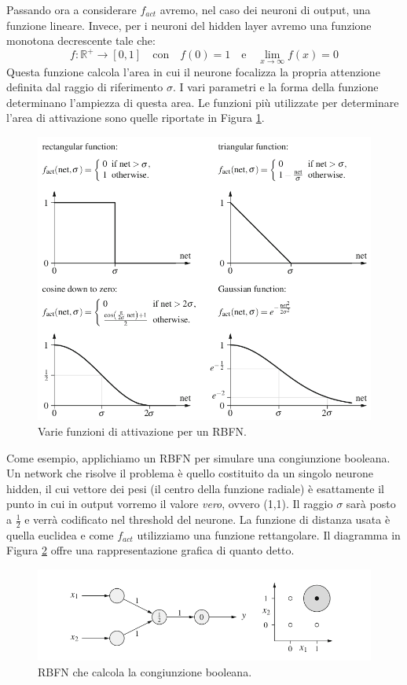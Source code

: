 \documentclass[10pt,a4paper]{article}
\begin{document}
Passando ora a considerare $f_{act}$ avremo, nel caso dei neuroni di output, una funzione lineare. Invece, per i neuroni del hidden layer avremo una funzione monotona decrescente tale che:
$$
f: \mathbb{R}^{+} \to [0,1] \quad \text{con} \quad f(0) = 1 \quad \text{e} \quad \lim_{x \to \infty} f(x) = 0
$$
Questa funzione calcola l'area in cui il neurone focalizza la propria attenzione definita dal raggio di riferimento $\sigma$. I vari parametri e la forma della funzione determinano l'ampiezza di questa area. Le funzioni più utilizzate per determinare l'area di attivazione sono quelle riportate in Figura \ref{fig:17}.
\begin{figure}
\centering
\includegraphics[scale=0.3]{img/act_rbf.png}
\caption{Varie funzioni di attivazione per un RBFN.}
\label{fig:17}
\end{figure}
Come esempio, applichiamo un RBFN per simulare una congiunzione booleana. Un network che risolve il problema è quello costituito da un singolo neurone hidden, il cui vettore dei pesi (il centro della funzione radiale) è esattamente il punto in cui in output vorremo il valore \emph{vero}, ovvero (1,1). Il raggio $\sigma$ sarà posto a $\frac{1}{2}$ e verrà codificato nel threshold del neurone. La funzione di distanza usata è quella euclidea e come $f_{act}$ utilizziamo una funzione rettangolare. Il diagramma in Figura \ref{fig:18} offre una rappresentazione grafica di quanto detto. 
\begin{figure}
\centering
\includegraphics[scale=0.4]{img/and_rbf.png}
\caption{RBFN che calcola la congiunzione booleana.}
\label{fig:18}
\end{figure}
\end{document}
